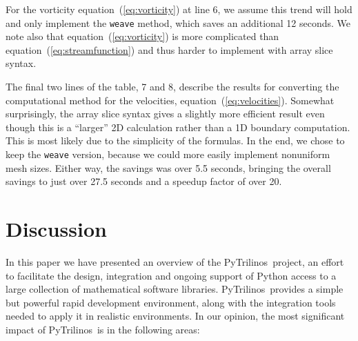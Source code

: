 \documentclass[acmtocl]{acmtrans2m}
\newcommand{\PyTrilinos}{{PyTrilinos}}
\begin{document}
For the vorticity equation~(\ref{eq:vorticity}) at line 6, we assume
this trend will hold and only implement the {\tt weave} method, which
saves an additional 12 seconds.  We note also that
equation~(\ref{eq:vorticity}) is more complicated than
equation~(\ref{eq:streamfunction}) and thus harder to implement with
array slice syntax.

The final two lines of the table, 7 and 8, describe the results for
converting the computational method for the velocities,
equation~(\ref{eq:velocities}).  Somewhat surprisingly, the array
slice syntax gives a slightly more efficient result even though this
is a ``larger'' 2D calculation rather than a 1D boundary computation.
This is most likely due to the simplicity of the formulas.  In the
end, we chose to keep the {\tt weave} version, because we could more
easily implement nonuniform mesh sizes.  Either way, the savings was
over 5.5 seconds, bringing the overall savings to just over 27.5
seconds and a speedup factor of over 20.

\section{Discussion}
\label{sec:discussion}

In this paper we have presented an overview of the \PyTrilinos\
project, an effort to facilitate the design, integration and ongoing
support of Python access to a large collection of mathematical
software libraries. \PyTrilinos\ provides a simple but powerful
rapid development environment, along with the integration tools
needed to apply it in realistic environments. In our opinion, the
most significant impact of \PyTrilinos\ is in the following areas:
\end{document}
